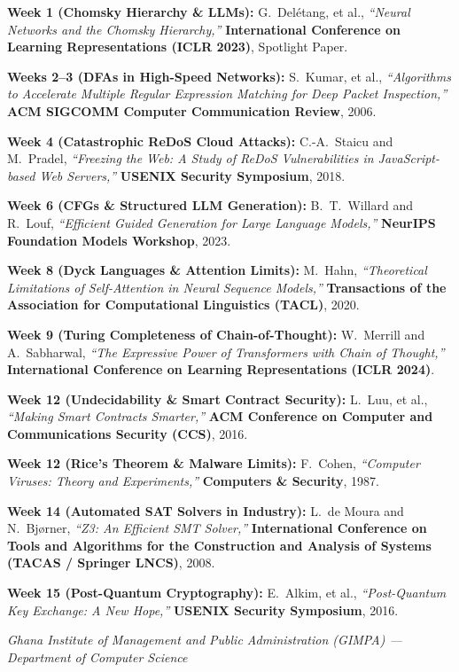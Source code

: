 \documentclass[11pt,a4paper]{article}
\begin{document}
\begin{enumerate}[label=\textbf{[\arabic*]}, leftmargin=2em, itemsep=3.5pt]
    \item \textbf{Week 1 (Chomsky Hierarchy \& LLMs):} G.~Delétang, et al., \textit{``Neural Networks and the Chomsky Hierarchy,''} \textbf{International Conference on Learning Representations (ICLR 2023)}, Spotlight Paper.
    
    \item \textbf{Weeks 2--3 (DFAs in High-Speed Networks):} S.~Kumar, et al., \textit{``Algorithms to Accelerate Multiple Regular Expression Matching for Deep Packet Inspection,''} \textbf{ACM SIGCOMM Computer Communication Review}, 2006.
    
    \item \textbf{Week 4 (Catastrophic ReDoS Cloud Attacks):} C.-A.~Staicu and M.~Pradel, \textit{``Freezing the Web: A Study of ReDoS Vulnerabilities in JavaScript-based Web Servers,''} \textbf{USENIX Security Symposium}, 2018.
    
    \item \textbf{Week 6 (CFGs \& Structured LLM Generation):} B.~T.~Willard and R.~Louf, \textit{``Efficient Guided Generation for Large Language Models,''} \textbf{NeurIPS Foundation Models Workshop}, 2023.
    
    \item \textbf{Week 8 (Dyck Languages \& Attention Limits):} M.~Hahn, \textit{``Theoretical Limitations of Self-Attention in Neural Sequence Models,''} \textbf{Transactions of the Association for Computational Linguistics (TACL)}, 2020.
    
    \item \textbf{Week 9 (Turing Completeness of Chain-of-Thought):} W.~Merrill and A.~Sabharwal, \textit{``The Expressive Power of Transformers with Chain of Thought,''} \textbf{International Conference on Learning Representations (ICLR 2024)}.
    
    \item \textbf{Week 12 (Undecidability \& Smart Contract Security):} L.~Luu, et al., \textit{``Making Smart Contracts Smarter,''} \textbf{ACM Conference on Computer and Communications Security (CCS)}, 2016.
    
    \item \textbf{Week 12 (Rice's Theorem \& Malware Limits):} F.~Cohen, \textit{``Computer Viruses: Theory and Experiments,''} \textbf{Computers \& Security}, 1987.
    
    \item \textbf{Week 14 (Automated SAT Solvers in Industry):} L.~de Moura and N.~Bj{\o}rner, \textit{``Z3: An Efficient SMT Solver,''} \textbf{International Conference on Tools and Algorithms for the Construction and Analysis of Systems (TACAS / Springer LNCS)}, 2008.
    
    \item \textbf{Week 15 (Post-Quantum Cryptography):} E.~Alkim, et al., \textit{``Post-Quantum Key Exchange: A New Hope,''} \textbf{USENIX Security Symposium}, 2016.
\end{enumerate}

\vfill
\begin{center}
    \small\color{darkgray}
    \textit{Ghana Institute of Management and Public Administration (GIMPA) --- Department of Computer Science}
\end{center}
\end{document}
